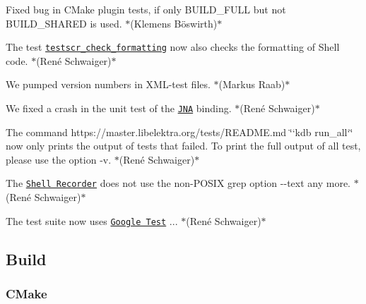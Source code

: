 \begin{DoxyItemize}
\item Fixed bug in C\+Make plugin tests, if only {\ttfamily B\+U\+I\+L\+D\+\_\+\+F\+U\+LL} but not {\ttfamily B\+U\+I\+L\+D\+\_\+\+S\+H\+A\+R\+ED} is used. $\ast$(Klemens Böswirth)$\ast$
\item The test \href{https://master.libelektra.org/tests/shell/check_formatting.sh}{\tt {\ttfamily testscr\+\_\+check\+\_\+formatting}} now also checks the formatting of Shell code. $\ast$(René Schwaiger)$\ast$
\item We pumped version numbers in X\+M\+L-\/test files. $\ast$(Markus Raab)$\ast$
\item We fixed a crash in the unit test of the \href{https://www.libelektra.org/bindings/jna}{\tt J\+NA} binding. $\ast$(René Schwaiger)$\ast$
\item The command https\+://master.libelektra.\+org/tests/\+R\+E\+A\+D\+ME.md \char`\"{}`kdb run\+\_\+all`\char`\"{} now only prints the output of tests that failed. To print the full output of all test, please use the option {\ttfamily -\/v}. $\ast$(René Schwaiger)$\ast$
\item The \href{https://master.libelektra.org/tests/shell/shell_recorder}{\tt Shell Recorder} does not use the non-\/\+P\+O\+S\+IX grep option {\ttfamily -\/-\/text} any more. $\ast$(René Schwaiger)$\ast$
\item The test suite now uses \href{https://github.com/google/googletest}{\tt Google Test} {..}. $\ast$(René Schwaiger)$\ast$
\end{DoxyItemize}

\subsection*{Build}

\subsubsection*{C\+Make}



